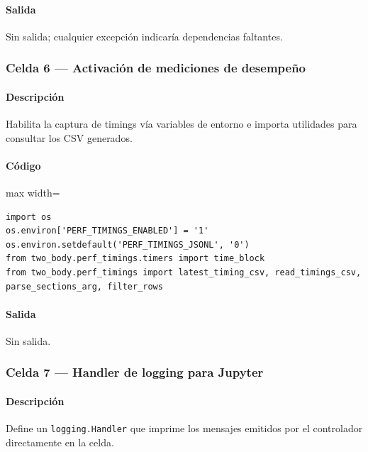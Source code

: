 \paragraph{Salida} Sin salida; cualquier excepción indicaría dependencias faltantes.

\subsubsection*{Celda 6 — Activación de mediciones de desempeño}
\paragraph{Descripción} Habilita la captura de timings vía variables de entorno e importa utilidades para consultar los CSV generados.
\paragraph{Código}
\begin{listing}[H]
\caption{Celda 6: configuración de \texttt{perf\_timings}}
\begin{adjustbox}{max width=\textwidth}
\begin{minipage}{\textwidth}
\begin{verbatim}
import os
os.environ['PERF_TIMINGS_ENABLED'] = '1'
os.environ.setdefault('PERF_TIMINGS_JSONL', '0')
from two_body.perf_timings.timers import time_block
from two_body.perf_timings import latest_timing_csv, read_timings_csv, parse_sections_arg, filter_rows
\end{verbatim}
\end{minipage}
\end{adjustbox}
\end{listing}
\paragraph{Salida} Sin salida.

\subsubsection*{Celda 7 — Handler de logging para Jupyter}
\paragraph{Descripción} Define un \texttt{logging.Handler} que imprime los mensajes emitidos por el controlador directamente en la celda.
